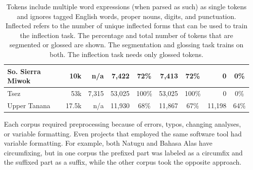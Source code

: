 \begin{table}[tb]
\begin{tabular}{l|r|r|rc|rc|rc}
         \hline
         So. Sierra Miwok & 10k  & n/a & 7,422 & 72\% & 7,413 & 72\% & 0  & 0\% \\
         \hline
         Tsez & 53k & 7,315 & 53,025 & 100\% & 53,025 & 100\% & 0  & 0\%  \\
         \hline
         Upper Tanana & 17.5k & n/a & 11,930 & 68\% & 11,867 & 67\% & 11,198 & 64\% 
    \end{tabular}
    \caption[Data Statistics]{Tokens include multiple word expressions (when parsed as such) as single tokens and ignores tagged English words, proper nouns, digits, and punctuation. Inflected refers to the number of unique inflected forms that can be used to train the inflection task. The percentage and total number of tokens that are segmented or glossed are shown.  The segmentation and glossing task trains on both. The inflection task needs only glossed tokens.}
    \label{tab:dissdata}
\end{table}


Each corpus required preprocessing because of errors, typos, changing analyses, or variable formatting. Even projects that employed the same software tool had variable formatting. For example, both Natugu and Bahasa Alas have circumfixing, but in one corpus the prefixed part was labeled as a circumfix and the suffixed part as a suffix, while the other corpus took the opposite approach. 


